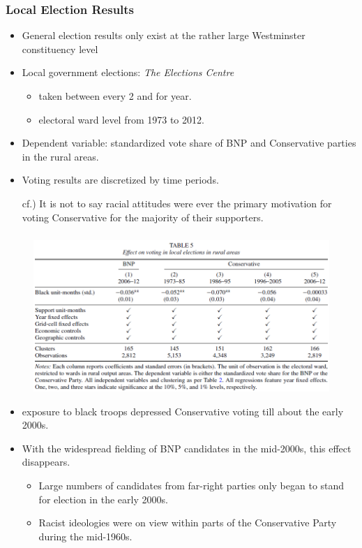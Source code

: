 \documentclass[dvipdfmx,11pt]{beamer}
\begin{document}
\begin{frame}\frametitle{Local Election Results}
  \begin{itemize}
    \item General election results only exist at the rather large Westminster constituency level
    \item Local government elections: \textit{The Elections Centre}
    \begin{itemize}
      \item taken between every 2 and for year.
      \item electoral ward level from 1973 to 2012.
    \end{itemize}
    \item Dependent variable: standardized vote share of BNP and Conservative parties in the rural areas.
    \item Voting results are discretized by time periods.
    \item[cf.)] It is not to say racial attitudes were ever the primary motivation for voting Conservative for the majority of their supporters.
  \end{itemize}
\end{frame}

\begin{frame}\frametitle{}
  \begin{figure}
    \centering
    \includegraphics[scale = .6]{os1027tanji/T5}
  \end{figure}
  \begin{itemize}
    \footnotesize
    \item exposure to black troops depressed Conservative voting till about the early 2000s.
    \item With the widespread fielding of BNP candidates in the mid-2000s, this effect disappears.
    \begin{itemize}
      \scriptsize
      \item Large numbers of candidates from far-right parties only began to stand for election in the early 2000s.
      \item Racist ideologies were on view within parts of the Conservative Party during the mid-1960s.
    \end{itemize}
  \end{itemize}
\end{frame}
\end{document}

